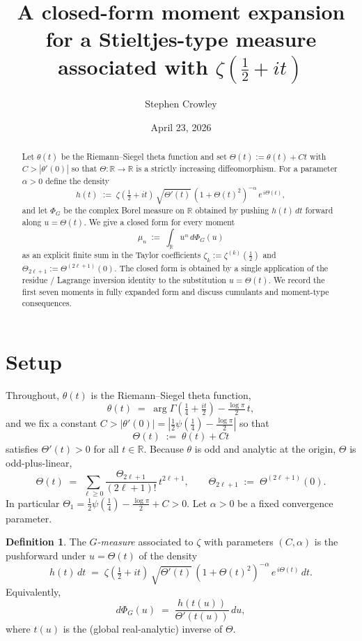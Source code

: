 \documentclass[11pt]{amsart}
\title{A closed-form moment expansion for a Stieltjes-type measure
       associated with $\zeta(\tfrac12+it)$}
\author{Stephen Crowley}
\date{April 23, 2026}
\theoremstyle{definition}
\newtheorem{definition}[theorem]{Definition}
\begin{document}
\maketitle

\begin{abstract}
Let $\theta(t)$ be the Riemann--Siegel theta function and set
$\Theta(t):=\theta(t)+Ct$ with $C>|\theta'(0)|$ so that $\Theta:\mathbb{R}\to\mathbb{R}$ is a
strictly increasing diffeomorphism.  For a parameter $\alpha>0$ define the density
\[
   h(t)\;:=\;\zeta(\tfrac12+it)\,\sqrt{\Theta'(t)}\,(1+\Theta(t)^{2})^{-\alpha}\,e^{\,i\Theta(t)},
\]
and let $\Phi_{G}$ be the complex Borel measure on $\mathbb{R}$ obtained by pushing
$h(t)\,dt$ forward along $u=\Theta(t)$.  We give a closed form for every moment
\[
   \mu_n \;:=\;\int_{\mathbb{R}} u^{n}\,d\Phi_{G}(u)
\]
as an explicit finite sum in the Taylor coefficients
$\zeta_{k}:=\zeta^{(k)}(\tfrac12)$ and $\Theta_{2\ell+1}:=\Theta^{(2\ell+1)}(0)$.
The closed form is obtained by a single application of the residue / Lagrange
inversion identity to the substitution $u=\Theta(t)$.  We record the first
seven moments in fully expanded form and discuss cumulants and moment-type
consequences.
\end{abstract}

\section{Setup}

Throughout, $\theta(t)$ is the Riemann--Siegel theta function,
\[
   \theta(t) \;=\; \arg\Gamma\!\left(\tfrac14+\tfrac{it}{2}\right)
                   -\tfrac{\log \pi}{2}\,t,
\]
and we fix a constant $C>|\theta'(0)|=|{\tfrac12}\psi(\tfrac14)-\tfrac{\log\pi}{2}|$
so that
\[
   \Theta(t)\;:=\;\theta(t)+Ct
\]
satisfies $\Theta'(t)>0$ for all $t\in\mathbb{R}$.
Because $\theta$ is odd and analytic at the origin, $\Theta$ is odd-plus-linear,
\[
   \Theta(t)\;=\;\sum_{\ell\ge 0}\frac{\Theta_{2\ell+1}}{(2\ell+1)!}\,t^{2\ell+1},
   \qquad
   \Theta_{2\ell+1}\;:=\;\Theta^{(2\ell+1)}(0).
\]
In particular $\Theta_1=\tfrac12\psi(\tfrac14)-\tfrac{\log\pi}{2}+C>0$.
Let $\alpha>0$ be a fixed convergence parameter.

\begin{definition}\label{def:PhiG}
The \emph{$G$-measure} associated to $\zeta$ with parameters $(C,\alpha)$ is the
pushforward under $u=\Theta(t)$ of the density
\[
   h(t)\,dt \;=\; \zeta(\tfrac12+it)\,\sqrt{\Theta'(t)}\,(1+\Theta(t)^{2})^{-\alpha}\,
                 e^{\,i\Theta(t)}\,dt.
\]
Equivalently,
\[
   d\Phi_{G}(u)\;=\;\frac{h(t(u))}{\Theta'(t(u))}\,du,
\]
where $t(u)$ is the (global real-analytic) inverse of $\Theta$.
\end{definition}
\end{document}
